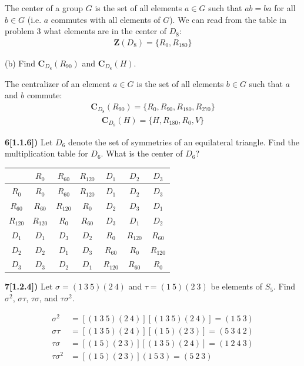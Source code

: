 \documentclass[12pt,a4paper]{article}
\newcommand{\prob}[2]{\textbf{#1)} #2}
\begin{document}
The center of a group $G$ is the set of all elements $a \in G$ such that $ab = ba$ for all $b \in G$ (i.e. $a$ commutes with all elements of $G$). We can read from the table in problem 3 what elements are in the center of $D_8$:
\begin{align*}
\mathbf{Z}(D_8) = \{R_0,R_{180}\}
\end{align*}

(b) Find $\mathbf{C}_{D_8}(R_{90})$ and $\mathbf{C}_{D_8}(H)$.

The centralizer of an element $a \in G$ is the set of all elements $b \in G$ such that $a$ and $b$ commute:
\begin{align*}
\mathbf{C}_{D_8}(R_{90}) = \{R_{0},R_{90},R_{180},R_{270}\}
\end{align*}
\begin{align*}
\mathbf{C}_{D_8}(H) = \{H,R_{180},R_{0},V\}
\end{align*}

\prob{6[1.1.6]}{Let $D_6$ denote the set of symmetries of an equilateral triangle. Find the multiplication table for $D_6$. What is the center of $D_6$?}

\begin{table}
 \begin{center}
  \begin{tabular}{c|cccccc}
   & $R_{0}$ & $R_{60}$ & $R_{120}$ & $D_1$ & $D_2$ & $D_3$ \\
  \hline
  $R_{0}$ & $R_{0}$ & $R_{60}$ & $R_{120}$ & $D_1$ & $D_2$ & $D_3$ \\
  $R_{60}$ & $R_{60}$ & $R_{120}$ & $R_{0}$ & $D_2$ & $D_3$ & $D_1$ \\
  $R_{120}$ & $R_{120}$ & $R_{0}$ & $R_{60}$ & $D_3$ & $D_1$ & $D_2$ \\
  $D_1$ & $D_1$ & $D_3$ & $D_2$ & $R_{0}$ & $R_{120}$ & $R_{60}$ \\
  $D_2$ & $D_2$ & $D_1$ & $D_3$ & $R_{60}$ & $R_{0}$ & $R_{120}$ \\
  $D_3$ & $D_3$ & $D_2$ & $D_1$ & $R_{120}$ & $R_{60}$ & $R_{0}$ \\
  \end{tabular}
 \end{center}
\end{table}

\prob{7[1.2.4]}{Let $\sigma = (1~3~5)(2~4)$ and $\tau = (1~5)(2~3)$ be elements of $S_5$. Find $\sigma^2$, $\sigma\tau$, $\tau\sigma$, and $\tau\sigma^2$.}

\begin{align*}
\sigma^2 &= [(1~3~5)(2~4)][(1~3~5)(2~4)] = (1~5~3) \\
\sigma\tau &= [(1~3~5)(2~4)][(1~5)(2~3)] = (5~3~4~2) \\
\tau\sigma &= [(1~5)(2~3)][(1~3~5)(2~4)] = (1~2~4~3) \\
\tau\sigma^2 &= [(1~5)(2~3)](1~5~3) = (5~2~3)
\end{align*}
\end{document}
